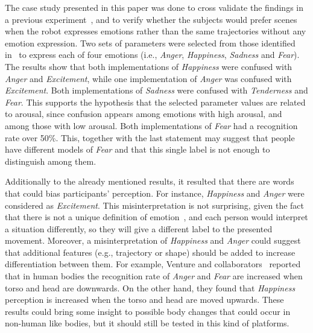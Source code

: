 The case study presented in this paper was done to cross validate the findings in a previous experiment~\cite{Angel2017-2}, and to verify whether the subjects would prefer scenes when the robot expresses emotions rather than the same trajectories without any emotion expression. Two sets of parameters were selected from those identified in~\cite{Angel2017-2} to express each of four emotions (i.e., \textit{Anger}, \textit{Happiness}, \textit{Sadness} and \textit{Fear}). The results show that both implementations of \textit{Happiness} were confused with \textit{Anger} and \textit{Excitement}, while one implementation of \textit{Anger} was confused with \textit{Excitement}. Both implementations of \textit{Sadness} were confused with \textit{Tenderness} and \textit{Fear}. This supports the hypothesis that the selected parameter values are related to arousal, since confusion appears among emotions with high arousal, and among those with low arousal. Both implementations of \textit{Fear} had a recognition rate over 50\%. This, together with the last statement may suggest that people have different models of \textit{Fear} and that this single label is not enough to distinguish among them. 

Additionally to the already mentioned results, it resulted that there are words that could bias participants' perception. For instance, \textit{Happiness} and \textit{Anger} were considered as \textit{Excitement}. This misinterpretation is not surprising, given the fact that there is not a unique definition of emotion~\cite{Plutchik2001,cacioppo2000handbook}, and each person would interpret a situation differently, so they will give a different label to the presented movement. Moreover, a misinterpretation of \textit{Happiness} and \textit{Anger} could suggest that additional features (e.g., trajectory or shape) should be added to increase differentiation between them. For example, Venture and collaborators~\cite{Venture2014} reported that in human bodies the recognition rate of \textit{Anger} and \textit{Fear} are increased when torso and head are downwards. On the other hand, they found that \textit{Happiness} perception is increased when the torso and head are moved upwards. These results could bring some insight to possible body changes that could occur in non-human like bodies, but it should still be tested in this kind of platforms.
 
